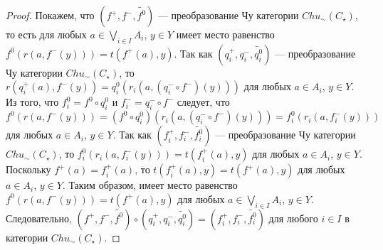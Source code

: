 \documentclass[a4paper,12pt]{article}
\begin{document}
\begin{proof}
    Покажем, что $(f^+,f^-,\widetilde{f^0})$ --- преобразование Чу категории $Chu_\sim(C_\star)$, то есть для любых $a \in \bigvee_{i \in I} A_i$, $y \in Y$ имеет место равенство $f^0(r(a,f^-(y))) = t(f^+(a),y)$. Так как $(q^+_i,q^-_i,\widetilde{q^0_i})$ --- преобразование Чу категории $Chu_\sim(C_\star)$, то $r(q^+_i(a),f^-(y)) = q^0_i(r_i(a,(q^-_i \circ f^-)(y)))$ для любых $a \in A_i$, $y \in Y$. Из того, что $f^0_i = f^0 \circ q^0_i$ и $f^-_i = q^-_i \circ f^-$ следует, что $f^0(r(a,f^-(y))) = (f^0 \circ q^0_i)(r_i(a,(q^-_i \circ f^-)(y))) = f^0_i(r_i(a,f^-_i(y)))$ для любых $a \in A_i$, $y \in Y$. Так как $(f^+_i,f^-_i,\widetilde{f^0_i})$ --- преобразование Чу категории $Chu_\sim(C_\star)$, то $f^0_i(r_i(a,f^-_i(y))) = t(f^+_i(a),y)$ для любых $a \in A_i$, $y \in Y$. Поскольку $f^+(a) = f^+_i(a)$, то $t(f^+_i(a),y) = t(f^+(a),y)$ для любых $a \in A_i$, $y \in Y$. Таким образом, имеет место равенство $f^0(r(a,f^-(y))) = t(f^+(a),y)$ для любых $a \in \bigvee_{i \in I} A_i$, $y \in Y$.
    Следовательно, $(f^+,f^-,\widetilde{f^0}) \circ (q^+_i, q^-_i, \widetilde{q^0_i}) = (f^+_i, f^-_i, \widetilde{f^0_i})$ для любого $i \in I$ в категории $Chu_\sim(C_\star)$.
\end{proof}
\end{document}
